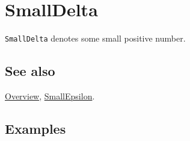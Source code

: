 \documentclass[../FeynCalcManual.tex]{subfiles}
\begin{document}
\hypertarget{smalldelta}{
\section{SmallDelta}\label{smalldelta}}

\texttt{SmallDelta} denotes some small positive number.

\subsection{See also}

\hyperlink{toc}{Overview}, \hyperlink{smallepsilon}{SmallEpsilon}.

\subsection{Examples}
\end{document}
